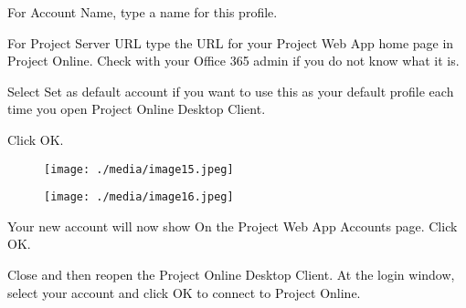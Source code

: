 \documentclass[12pt]{report}
\renewcommand{\_}{\kern-1.5pt\textunderscore\kern-1.5pt}
\begin{document}
	\item \textcolor[HTML]{0D0D0D}{For Account Name, type a name for this profile.}\par


\vspace{\baselineskip}	\item \textcolor[HTML]{0D0D0D}{For Project Server URL type the URL for your Project Web App home page in Project Online. Check with your Oﬃce 365 admin if you do not know what it is.}\par

	\item \textcolor[HTML]{0D0D0D}{Select Set as default account if you want to use this as your default profile each time you open Project Online Desktop Client.}\par

	\item \textcolor[HTML]{0D0D0D}{Click OK.}\par




\begin{figure}[H]
\advance\leftskip 2.28in		\texttt{[image: ./media/image15.jpeg]}
\end{figure}



\par


\vspace{\baselineskip}


\begin{figure}[H]
	\begin{FlushLeft}		\texttt{[image: ./media/image16.jpeg]}
	\end{FlushLeft}\end{figure}



	\item \textcolor[HTML]{0D0D0D}{Your new account will now show On the Project Web App Accounts page. Click OK.}\par


\vspace{\baselineskip}
\vspace{\baselineskip}	\item \textcolor[HTML]{0D0D0D}{ Close and then reopen the Project Online Desktop Client. At the login window, select your account and click OK to connect to Project Online.}\par
\end{document}

